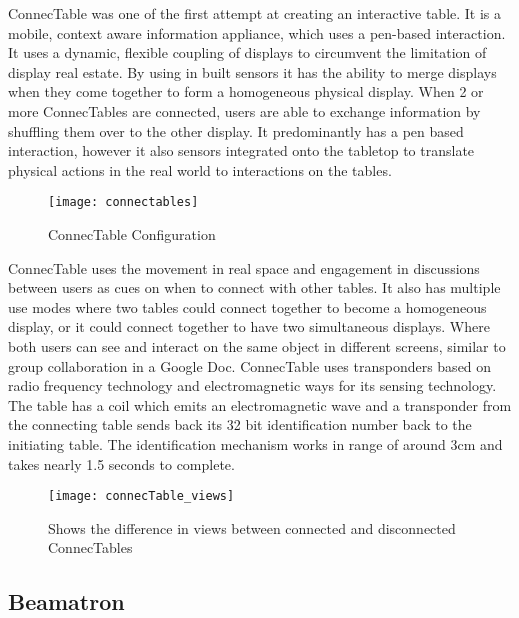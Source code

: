 ConnecTable\cite{connectables} was one of the first attempt at creating
an interactive table. It is a mobile, context aware
information appliance, which uses a pen-based interaction. It uses
a dynamic, flexible coupling of displays to circumvent the limitation
of display real estate. By using in built sensors it has the ability
to merge displays when they come together to form a homogeneous physical
display. When 2 or more ConnecTables are connected, users are able
to exchange information by shuffling them over to the other display.
It predominantly has a pen based interaction, however it also sensors
integrated onto the tabletop to translate physical actions in the
real world to interactions on the tables. 
\begin{figure}[H]
\centering
\texttt{[image: connectables]}

\protect\caption{ConnecTable Configuration}
\end{figure}
ConnecTable uses the movement in real space and engagement in discussions
between users as cues on when to connect with other tables. It also
has multiple use modes where two tables could connect together to
become a homogeneous display, or it could connect together to have
two simultaneous displays. Where both users can see and interact on
the same object in different screens, similar to group collaboration
in a Google Doc. ConnecTable uses transponders based on radio frequency
technology and electromagnetic ways for its sensing technology. The
table has a coil which emits an electromagnetic wave and a transponder
from the connecting table sends back its 32 bit identification number
back to the initiating table. The identification mechanism works in
range of around 3cm and takes nearly 1.5 seconds to complete.

\begin{figure}[h]
\centering
\texttt{[image: connecTable\_views]}
\protect\caption{Shows the difference in views between connected and disconnected ConnecTables}
\end{figure}

\subsection{Beamatron}

